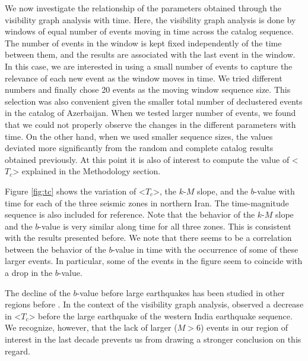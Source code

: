 We now investigate the relationship of the parameters obtained through the visibility graph analysis with time. Here, the visibility graph analysis is done by windows of equal number of events moving in time across the catalog sequence. The number of events in the window is kept fixed independently of the time between them, and the results are associated with the last event in the window. In this case, we are interested in using a small number of events to capture the relevance of each new event as the window moves in time. We tried different numbers and finally chose 20 events as the moving window sequence size. This selection was also convenient given the smaller total number of declustered events in the catalog of Azerbaijan. When we tested larger number of events, we found that we could not properly observe the changes in the different parameters with time. On the other hand, when we used smaller sequence sizes, the values deviated more significantly from the random and complete catalog results obtained previously. At this point it is also of interest to compute the value of <$T_c$> explained in the Methodology section.

Figure \ref{fig:tc} shows the variation of <$T_c$>, the $k$-$M$ slope, and the $b$-value with time for each of the three seismic zones in northern Iran. The time-magnitude sequence is also included for reference. Note that the behavior of the $k$-$M$ slope and the $b$-value is very similar along time for all three zones. This is consistent with the results presented before. We note that there seems to be a correlation between the behavior of the $b$-value in time with the occurrence of some of these larger events. In particular, some of the events in the figure seem to coincide with a drop in the $b$-value. 

The decline of the $b$-value before large earthquakes has been studied in other regions before \citep[e.g.,][]{Wyss2000, Wyss2006, Schorlemmer2005, Chan2012}. In the context of the visibility graph analysis, \citet{Telesca2016} observed a decrease in <$T_c$> before the large earthquake of the western India earthquake sequence. We recognize, however, that the lack of larger ($M>6$) events in our region of interest in the last decade prevents us from drawing a stronger conclusion on this regard. 
